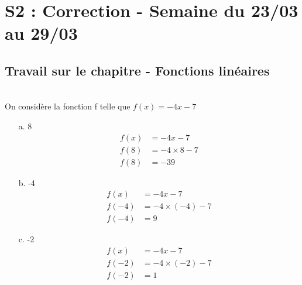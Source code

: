 \documentclass[11pt]{article}
\begin{document}

\newtheorem{Definition}{Définition}
\newtheorem{Theorem}{Théorème}
\newtheorem{Proposition}{Propriété}
\newtheorem{Exo}{Éxercice}

\renewcommand{\labelitemi}{$\bullet$}
\renewcommand{\labelitemii}{$\circ$}

\setlength{\columnseprule}{1pt}

\section{S2 : Correction - Semaine du 23/03 au 29/03}

\subsection{Travail sur le chapitre - Fonctions linéaires}

\\
On considère la fonction f telle que $f(x) = -4x - 7$

\begin{multicols}{3}
\begin{enumerate}
    \item[a.] 8
    \begin{align*}
        f(x) &= -4x - 7 \\
        f(8) &= -4 \times 8 - 7 \\
        f(8) &= -39  
    \end{align*}\columnbreak

    \item[b.]  -4
    \begin{align*}
        f(x) &= -4x - 7 \\
        f(-4) &= -4 \times (-4) - 7 \\
        f(-4) &= 9
    \end{align*}\columnbreak

    \item[c.]  -2
    \begin{align*}
        f(x) &= -4x - 7 \\
        f(-2) &= -4 \times (-2) - 7 \\
        f(-2) &= 1
    \end{align*}

\end{enumerate}
 \end{multicols}
\end{document}
